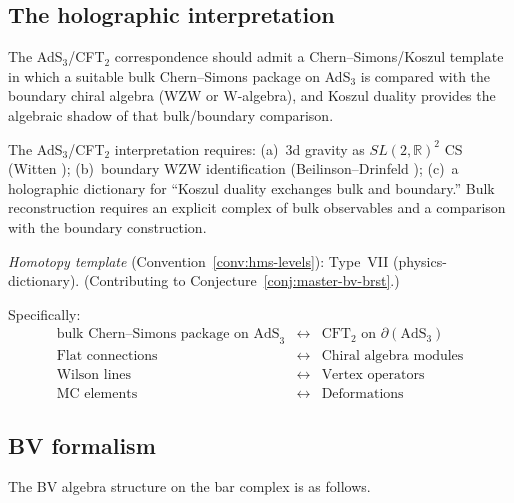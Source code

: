 

\subsection{The holographic interpretation}

\begin{conjecture}
\label{conj:ads-cft-cs-koszul}
The AdS$_3$/CFT$_2$ correspondence should admit a
Chern--Simons/Koszul template in which a suitable bulk Chern--Simons
package on AdS$_3$ is compared with the boundary chiral algebra (WZW or
W-algebra), and Koszul duality provides the algebraic shadow of that
bulk/boundary comparison.
\end{conjecture}

\begin{remark}[Scope]
The AdS$_3$/CFT$_2$ interpretation requires: (a)~3d gravity as $SL(2,\mathbb{R})^2$ CS (Witten \cite{Wit89}); (b)~boundary WZW identification (Beilinson--Drinfeld \cite{BD04}); (c)~a holographic dictionary for ``Koszul duality exchanges bulk and boundary.''  Bulk reconstruction requires an explicit complex of bulk observables and a comparison with the boundary construction.

\emph{Homotopy template} (Convention~\ref{conv:hms-levels}): Type~VII (physics-dictionary).  (Contributing to Conjecture~\ref{conj:master-bv-brst}.)
\end{remark}

Specifically:
\[
\begin{array}{ccc}
\text{bulk Chern--Simons package on AdS}_3 & \longleftrightarrow & \text{CFT}_2 \text{ on } \partial(\text{AdS}_3) \\
\text{Flat connections} & \longleftrightarrow & \text{Chiral algebra modules} \\
\text{Wilson lines} & \longleftrightarrow & \text{Vertex operators} \\
\text{MC elements} & \longleftrightarrow & \text{Deformations}
\end{array}
\]

\subsection{BV formalism}

The BV algebra structure on the bar complex is as follows.

